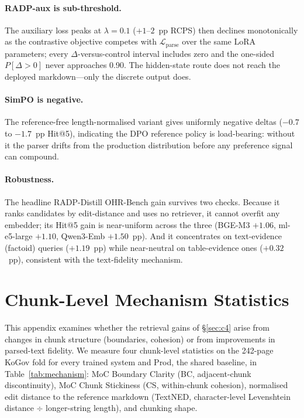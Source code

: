\documentclass[11pt]{article}
\newcommand{\rcps}{\textsc{RCPS}}
\begin{document}
\paragraph{RADP-aux is sub-threshold.} The auxiliary loss peaks at $\lambda = 0.1$ ($+1$--$2$~pp \rcps{}) then declines monotonically as the contrastive objective competes with $\mathcal{L}_\text{parse}$ over the same LoRA parameters; every $\Delta$-versus-control interval includes zero and the one-sided $P[\Delta{>}0]$ never approaches 0.90. The hidden-state route does not reach the deployed markdown---only the discrete output does.

\paragraph{SimPO is negative.} The reference-free length-normalised variant gives uniformly negative deltas ($-0.7$ to $-1.7$~pp Hit@5), indicating the DPO reference policy is load-bearing: without it the parser drifts from the production distribution before any preference signal can compound.

\paragraph{Robustness.} The headline RADP-Distill OHR-Bench gain survives two checks. Because it ranks candidates by edit-distance and uses no retriever, it cannot overfit any embedder; its Hit@5 gain is near-uniform across the three (BGE-M3 $+1.06$, ml-e5-large $+1.10$, Qwen3-Emb $+1.50$~pp). And it concentrates on text-evidence (factoid) queries ($+1.19$~pp) while near-neutral on table-evidence ones ($+0.32$~pp), consistent with the text-fidelity mechanism.

\section{Chunk-Level Mechanism Statistics}
\label{app:mechanism}

This appendix examines whether the retrieval gains of \S\ref{sec:c4} arise from changes in chunk structure (boundaries, cohesion) or from improvements in parsed-text fidelity. We measure four chunk-level statistics on the 242-page KoGov fold for every trained system and Prod, the shared baseline, in Table~\ref{tab:mechanism}: MoC Boundary Clarity (BC, adjacent-chunk discontinuity), MoC Chunk Stickiness (CS, within-chunk cohesion), normalised edit distance to the reference markdown (TextNED, character-level Levenshtein distance $\div$ longer-string length), and chunking shape.
\end{document}
